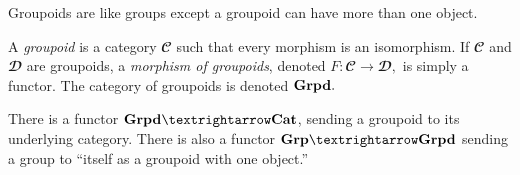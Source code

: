 \documentclass[../main/CT4S-EN-RU]{subfiles}
\begin{document}
\begin{blockENG}
Groupoids are like groups except a groupoid can have more than one object. 
\end{blockENG}

\begin{blockRUS}
\end{blockRUS}

\begin{definitionENG}
A {\em groupoid} is a category ${𝓒}$ such that every morphism is an isomorphism. If ${𝓒}$ and ${𝓓}$ are groupoids, a {\em morphism of groupoids}, denoted $F\colon{𝓒}{→}{𝓓},$ is simply a functor. The category of groupoids is denoted ${\mathbf{Grpd}}.$
\end{definitionENG}

\begin{definitionRUS}
\end{definitionRUS}

\begin{exampleENG}
There is a functor $\Grpd{→}\Cat$, sending a groupoid to its underlying category. There is also a functor $\Grp{→}\Grpd$ sending a group to “itself as a groupoid with one object.” 
\end{exampleENG}

\begin{exampleRUS}
\end{exampleRUS}
\end{document}
